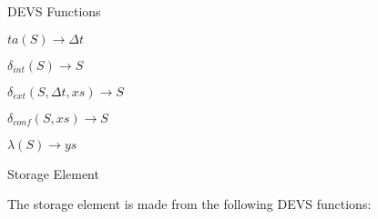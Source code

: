 DEVS Functions

$ta(S) \rightarrow{} \Delta{}t$

$\delta{}_{int}(S) \rightarrow{} S$

$\delta{}_{ext}(S, \Delta{}t, xs) \rightarrow{} S$

$\delta{}_{conf}(S, xs) \rightarrow{} S$

$\lambda(S) \rightarrow{} ys$

Storage Element

The storage element is made from the following DEVS functions:

\vfill\eject
